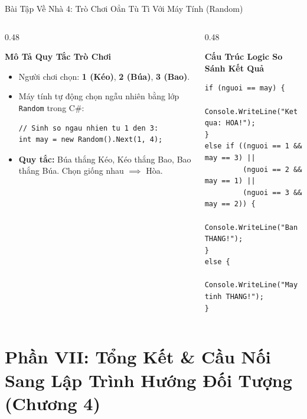 \documentclass[aspectratio=169, 10pt]{beamer}
\begin{document}
\begin{frame}[fragile]{Bài Tập Về Nhà 4: Trò Chơi Oẳn Tù Tì Với Máy Tính (Random)}
  \begin{columns}[T]
    \begin{column}{0.48\textwidth}
      \begin{block}{\textbf{Mô Tả Quy Tắc Trò Chơi}}
        \begin{itemize}
          \item Người chơi chọn: \textbf{1 (Kéo)}, \textbf{2 (Búa)}, \textbf{3 (Bao)}.
          \item Máy tính tự động chọn ngẫu nhiên bằng lớp \texttt{Random} trong C\#:
\begin{lstlisting}
// Sinh so ngau nhien tu 1 den 3:
int may = new Random().Next(1, 4);
\end{lstlisting}
          \item \textbf{Quy tắc:} Búa thắng Kéo, Kéo thắng Bao, Bao thắng Búa. Chọn giống nhau $\implies$ Hòa.
        \end{itemize}
      \end{block}
    \end{column}
    \begin{column}{0.48\textwidth}
      \begin{exampleblock}{\textbf{Cấu Trúc Logic So Sánh Kết Quả}}
\begin{lstlisting}
if (nguoi == may) {
    Console.WriteLine("Ket qua: HOA!");
}
else if ((nguoi == 1 && may == 3) || 
         (nguoi == 2 && may == 1) || 
         (nguoi == 3 && may == 2)) {
    Console.WriteLine("Ban THANG!");
}
else {
    Console.WriteLine("May tinh THANG!");
}
\end{lstlisting}
      \end{exampleblock}
    \end{column}
  \end{columns}
\end{frame}

\section{Phần VII: Tổng Kết \& Cầu Nối Sang Lập Trình Hướng Đối Tượng (Chương 4)}
\end{document}

